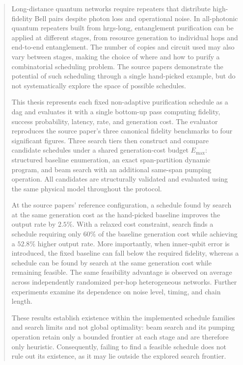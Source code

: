 \begin{abstract}

Long-distance quantum networks require repeaters that distribute high-fidelity Bell pairs despite photon loss and operational noise. In all-photonic quantum repeaters built from \Gls{hrgs-long}, entanglement purification can be applied at different stages, from resource generation to individual hops and end-to-end entanglement. The number of copies and circuit used may also vary between stages, making the choice of where and how to purify a combinatorial scheduling problem. The source papers demonstrate the potential of such scheduling through a single hand-picked example, but do not systematically explore the space of possible schedules.

This thesis represents each fixed non-adaptive purification schedule as a \Gls{dag} and evaluates it with a single bottom-up pass computing fidelity, success probability, latency, rate, and generation cost. The evaluator reproduces the source paper's three canonical fidelity benchmarks to four significant figures. Three search tiers then construct and compare candidate schedules under a shared generation-cost budget $E_{\max}$: structured baseline enumeration, an exact span-partition dynamic program, and beam search with an additional same-span pumping operation. All candidates are structurally validated and evaluated using the same physical model throughout the protocol.

At the source papers' reference configuration, a schedule found by search at the same generation cost as the hand-picked baseline improves the output rate by $2.5\%$. With a relaxed cost constraint, search finds a schedule requiring only $60\%$ of the baseline generation cost while achieving a $52.8\%$ higher output rate. More importantly, when inner-qubit error is introduced, the fixed baseline can fall below the required fidelity, whereas a schedule can be found by search at the same generation cost while remaining feasible. The same feasibility advantage is observed on average across independently randomized per-hop heterogeneous networks. Further experiments examine its dependence on noise level, timing, and chain length.

These results establish existence within the implemented schedule families and search limits and not global optimality: beam search and its pumping operation retain only a bounded frontier at each stage and are therefore only heuristic. Consequently, failing to find a feasible schedule does not rule out its existence, as it may lie outside the explored search frontier.


\end{abstract}